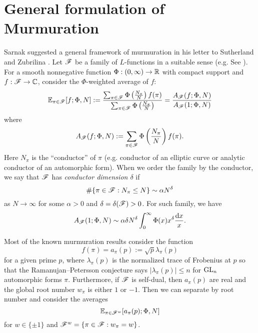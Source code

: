 \section{General formulation of Murmuration}
\label{sec:general}


Sarnak suggested a general framework of murmuration in his letter to Sutherland and Zubrilina \cite{sarnak}.
Let $\mathscr{F}$ be a family of $L$-functions in a suitable sense (e.g. See \cite{sarnak2016families}).
For a smooth nonnegative function $\Phi : (0, \infty) \to \mathbb{R}$ with compact support and $f : \mathscr{F} \to \mathbb{C}$, consider the $\Phi$-weighted average of $f$:
\begin{equation}
    \mathbb{E}_{\pi \in \mathscr{F}}[f; \Phi, N] := \frac{\sum_{\pi \in \mathscr{F}} \Phi\left(\frac{N_\pi}{N}\right)f(\pi)}{\sum_{\pi \in \mathscr{F}} \Phi\left(\frac{N_\pi}{N}\right)} = \frac{A_{\mathscr{F}}(f; \Phi, N)}{A_{\mathscr{F}}(1; \Phi, N)}
\end{equation}
where
\begin{equation}
    A_{\mathscr{F}}(f; \Phi, N) := \sum_{\pi \in \mathscr{F}} \Phi\left(\frac{N_\pi}{N}\right)f(\pi).
\end{equation}
Here $N_\pi$ is the ``conductor'' of $\pi$ (e.g. conductor of an elliptic curve or analytic conductor of an automorphic form).
When we order the family by the conductor, we say that $\mathscr{F}$ has \emph{conductor dimension $\delta$} if
\begin{equation}
    \# \{\pi \in \mathscr{F} : N_\pi \le N\} \sim \alpha N^\delta
\end{equation}
as $N \to \infty$ for some $\alpha > 0$ and $\delta = \delta(\mathscr{F}) > 0$.
For such family, we have
\[
A_{\mathscr{F}}(1; \Phi, N) \sim \alpha \delta N^\delta \int_0^\infty \Phi(x) x^\delta \frac{\mathrm{d} x}{x}.
\]

Most of the known murmuration results consider the function
\begin{equation}
    f(\pi) = a_\pi(p) := \sqrt{p} \lambda_\pi(p)
\end{equation}
for a given prime $p$, where $\lambda_\pi(p)$ is the normalized trace of Frobenius at $p$ so that the Ramanujan--Petersson conjecture says $|\lambda_\pi(p)| \le n$ for $\mathrm{GL}_n$ automorphic forms $\pi$.
Furthermore, if $\mathscr{F}$ is self-dual, then $a_\pi(p)$ are real and the global root number $w_\pi$ is either $1$ or $-1$.
Then we can separate by root number and consider the averages
\begin{equation}
    \mathbb{E}_{\pi \in \mathscr{F}^w} [a_\pi(p); \Phi, N]
\end{equation}
for $w \in \{\pm 1\}$ and $\mathscr{F}^w = \{\pi \in \mathscr{F} : w_\pi = w\}$.

